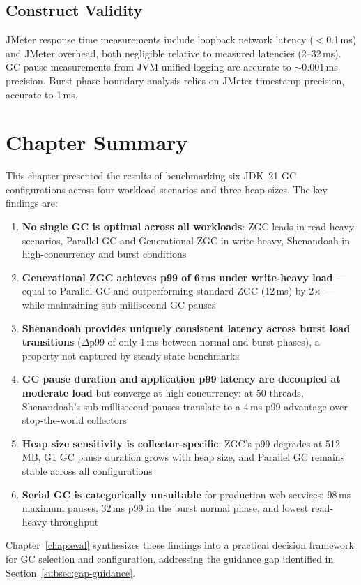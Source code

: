 \subsection{Construct Validity}
\label{subsec:construct-validity}

JMeter response time measurements include loopback network latency ($<$0.1\,ms) and JMeter overhead, both negligible relative to measured latencies (2--32\,ms). GC pause measurements from JVM unified logging are accurate to $\sim$0.001\,ms precision. Burst phase boundary analysis relies on JMeter timestamp precision, accurate to 1\,ms.

\section{Chapter Summary}
\label{sec:chapter3-summary}

This chapter presented the results of benchmarking six JDK~21 GC configurations across four workload scenarios and three heap sizes. The key findings are:

\begin{enumerate}
    \item \textbf{No single GC is optimal across all workloads}: ZGC leads in read-heavy scenarios, Parallel GC and Generational ZGC in write-heavy, Shenandoah in high-concurrency and burst conditions

    \item \textbf{Generational ZGC achieves p99 of 6\,ms under write-heavy load} --- equal to Parallel GC and outperforming standard ZGC (12\,ms) by 2$\times$ --- while maintaining sub-millisecond GC pauses

    \item \textbf{Shenandoah provides uniquely consistent latency across burst load transitions} ($\Delta$p99 of only 1\,ms between normal and burst phases), a property not captured by steady-state benchmarks

    \item \textbf{GC pause duration and application p99 latency are decoupled at moderate load} but converge at high concurrency: at 50 threads, Shenandoah's sub-millisecond pauses translate to a 4\,ms p99 advantage over stop-the-world collectors

    \item \textbf{Heap size sensitivity is collector-specific}: ZGC's p99 degrades at 512\,MB, G1 GC pause duration grows with heap size, and Parallel GC remains stable across all configurations

    \item \textbf{Serial GC is categorically unsuitable} for production web services: 98\,ms maximum pauses, 32\,ms p99 in the burst normal phase, and lowest read-heavy throughput
\end{enumerate}

Chapter~\ref{chap:eval} synthesizes these findings into a practical decision framework for GC selection and configuration, addressing the guidance gap identified in Section~\ref{subsec:gap-guidance}.
